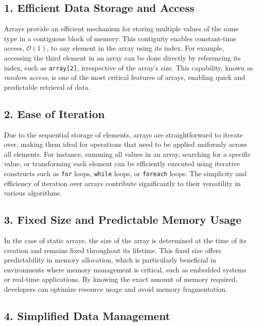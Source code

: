 \documentclass[12pt, oneside]{book}
\begin{document}
\subsection{1. Efficient Data Storage and Access}

Arrays provide an efficient mechanism for storing multiple values of the same type in a contiguous block of memory. This contiguity enables constant-time access, $\mathcal{O}(1)$, to any element in the array using its index. For example, accessing the third element in an array can be done directly by referencing its index, such as \texttt{array[2]}, irrespective of the array's size. This capability, known as \textit{random access}, is one of the most critical features of arrays, enabling quick and predictable retrieval of data.

\subsection{2. Ease of Iteration}

Due to the sequential storage of elements, arrays are straightforward to iterate over, making them ideal for operations that need to be applied uniformly across all elements. For instance, summing all values in an array, searching for a specific value, or transforming each element can be efficiently executed using iterative constructs such as \texttt{for} loops, \texttt{while} loops, or \texttt{foreach} loops. The simplicity and efficiency of iteration over arrays contribute significantly to their versatility in various algorithms.

\subsection{3. Fixed Size and Predictable Memory Usage}

In the case of static arrays, the size of the array is determined at the time of its creation and remains fixed throughout its lifetime. This fixed size offers predictability in memory allocation, which is particularly beneficial in environments where memory management is critical, such as embedded systems or real-time applications. By knowing the exact amount of memory required, developers can optimize resource usage and avoid memory fragmentation.

\subsection{4. Simplified Data Management}
\end{document}
